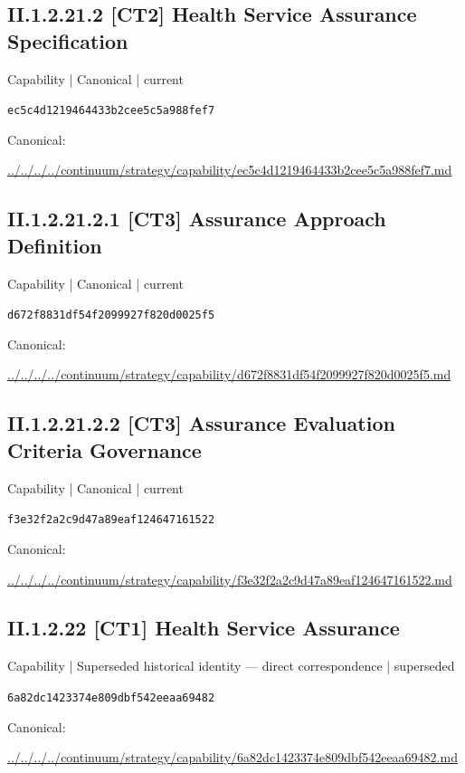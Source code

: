 \documentclass[10pt,a4paper]{article}
\begin{document}
\subsection*{II.1.2.21.2 [CT2] Health Service Assurance Specification}
{\small Capability | Canonical | current}\par
\texttt{ec5c4d1219464433b2cee5c5a988fef7}\par
Canonical: \par
{\footnotesize\url{../../../../continuum/strategy/capability/ec5c4d1219464433b2cee5c5a988fef7.md}}\par
\subsection*{II.1.2.21.2.1 [CT3] Assurance Approach Definition}
{\small Capability | Canonical | current}\par
\texttt{d672f8831df54f2099927f820d0025f5}\par
Canonical: \par
{\footnotesize\url{../../../../continuum/strategy/capability/d672f8831df54f2099927f820d0025f5.md}}\par
\subsection*{II.1.2.21.2.2 [CT3] Assurance Evaluation Criteria Governance}
{\small Capability | Canonical | current}\par
\texttt{f3e32f2a2c9d47a89eaf124647161522}\par
Canonical: \par
{\footnotesize\url{../../../../continuum/strategy/capability/f3e32f2a2c9d47a89eaf124647161522.md}}\par
\subsection*{II.1.2.22 [CT1] Health Service Assurance}
{\small Capability | Superseded historical identity — direct correspondence | superseded}\par
\texttt{6a82dc1423374e809dbf542eeaa69482}\par
Canonical: \par
{\footnotesize\url{../../../../continuum/strategy/capability/6a82dc1423374e809dbf542eeaa69482.md}}\par
\end{document}

